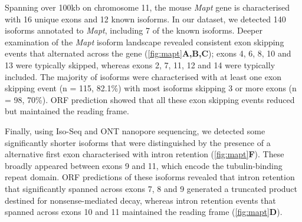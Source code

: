 Spanning over 100kb on chromosome 11, the mouse \textit{Mapt} gene is characterised with 16 unique exons and 12 known isoforms. In our dataset, we detected 140 isoforms annotated to \textit{Mapt}, including 7 of the known isoforms. Deeper examination of the \textit{Mapt} isoform landscape revealed consistent exon skipping events that alternated across the gene (\cref{fig:mapt}\textbf{A,B,C}); exons 4, 6, 8, 10 and 13 were typically skipped, whereas exons 2, 7, 11, 12 and 14 were typically included. The majority of isoforms were characterised with at least one exon skipping event (n = 115, 82.1\%) with most isoforms skipping 3 or more exons (n = 98, 70\%). ORF prediction showed that all these exon skipping events reduced but maintained the reading frame. 

Finally, using Iso-Seq and ONT nanopore sequencing, we detected some significantly shorter isoforms that were distinguished by the presence of a alternative first exon characterised with intron retention (\cref{fig:mapt}\textbf{F}). These broadly appeared between exons 9 and 11, which encode the tubulin-binding repeat domain. ORF predictions of these isoforms revealed that intron retention that significantly spanned across exons 7, 8 and 9 generated a truncated product destined for nonsense-mediated decay, whereas intron retention events that spanned across exons 10 and 11 maintained the reading frame (\cref{fig:mapt}\textbf{D}). 


